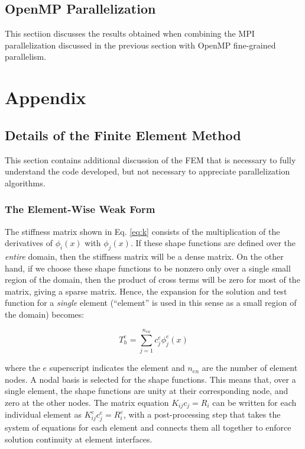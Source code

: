 \documentclass[10pt]{article}
\newcommand{\beq}{\begin{equation}}
\newcommand{\eeq}{\end{equation}}
\begin{document}
\subsection{OpenMP Parallelization}

This sectiion discusses the results obtained when combining the MPI parallelization discussed in the previous section with OpenMP fine-grained parallelism.












\section{Appendix}
\subsection{Details of the Finite Element Method}
This section contains additional discussion of the FEM that is necessary to fully understand the code developed, but not necessary to appreciate parallelization algorithms.

\subsubsection{The Element-Wise Weak Form}
The stiffness matrix shown in Eq. \eqref{eq:k} consists of the multiplication of the derivatives of \(\phi_i(x)\) with \(\phi_j(x)\). If these shape functions are defined over the {\it entire} domain, then the stiffness matrix will be a dense matrix. On the other hand, if we choose these shape functions to be nonzero only over a single small region of the domain, then the product of cross terms will be zero for most of the matrix, giving a sparse matrix. Hence, the expansion for the solution and test function for a {\it single} element (``element'' is used in this sense as a small region of the domain) becomes:

\beq
T_h^e=\sum_{j=1}^{n_{en}}c_j^e\phi_j^e(x)
\eeq

where the \(e\) superscript indicates the element and \(n_{en}\) are the number of element nodes. A nodal basis is selected for the shape functions. This means that, over a single element, the shape functions are unity at their corresponding node, and zero at the other nodes. The matrix equation \(K_{ij}c_j=R_i\) can be written for each individual element as \(K_{ij}^ec_j^e=R_i^e\), with a post-processing step that takes the system of equations for each element and connects them all together to enforce solution continuity at element interfaces. 
\end{document}
